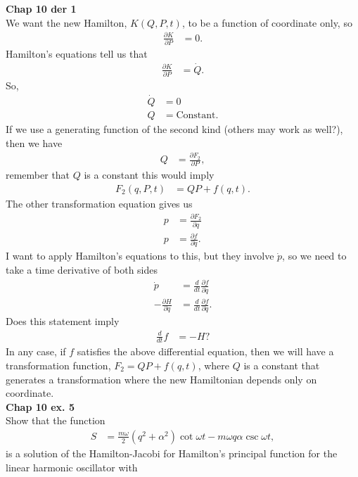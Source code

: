 \documentclass[10pt]{article}
\begin{document}
\textbf{Chap 10 der 1}\\
We want the new Hamilton, $K(Q,P,t)$, to be a function of coordinate only, so
\begin{align*}
  \frac{\partial K}{\partial P} &= 0.
\end{align*}
Hamilton's equations tell us that
\begin{align*}
  \frac{\partial K}{\partial P} &= \dot{Q}.
\end{align*}
So,
\begin{align*}
  \dot{Q} &= 0\\
  Q &= \textrm{Constant}.
\end{align*}
If we use a generating function of the second kind (others may work as well?),
then we have
\begin{align*}
  Q &= \frac{\partial F_2}{\partial P},
\end{align*}
remember that $Q$ is a constant this would imply
\begin{align*}
  F_2(q,P,t) &= QP + f(q,t).
\end{align*}
The other transformation equation gives us
\begin{align*}
  p &= \frac{\partial F_2}{\partial q}\\
  p &= \frac{\partial f}{\partial q}.
\end{align*}
I want to apply Hamilton's equations to this, but they involve $\dot p$, so
we need to take a time derivative of both sides
\begin{align*}
  \dot p &= \frac{d}{dt}\frac{\partial f}{\partial q}\\
  -\frac{\partial H}{\partial q} &= \frac{d}{dt}\frac{\partial f}{\partial q}.
\end{align*}
Does this statement imply
\begin{align*}
  \frac{d}{dt}f &= -H\textrm{?}
\end{align*}
In any case, if $f$ satisfies the above differential equation, then we will
have a transformation function, $F_2=QP+f(q,t)$, where $Q$ is a constant that
generates a transformation where the new Hamiltonian depends only on
coordinate.\\
\textbf{Chap 10 ex. 5}\\
Show that the function
\begin{align*}
  S &= \frac{m\omega}{2}\left( q^2+\alpha^2 \right)\cot\omega t - m\omega q\alpha\csc\omega t,
\end{align*}
is a solution of the Hamilton-Jacobi for Hamilton's principal function for the
linear harmonic oscillator with
\end{document}
